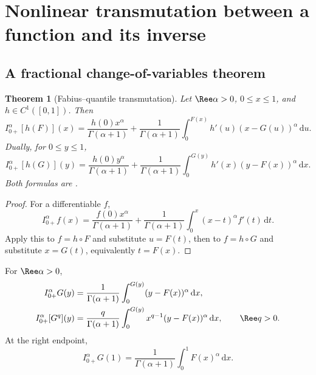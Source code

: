 \documentclass[11pt,oneside]{article}
\newtheorem{theorem}{Theorem}[section]
\theoremstyle{definition}
\theoremstyle{remark}
\newcommand{\dd}{\,\mathrm d}
\newcommand{\1}{\mathbf 1}
\begin{document}
\section{Nonlinear transmutation between a function and its inverse}
\label{p7:sec:inverse}

\subsection{A fractional change-of-variables theorem}

\begin{theorem}[Fabius--quantile transmutation]
\label{p7:thm:quantile-transmutation}
Let $\Ree\alpha>0$, $0\le x\le1$, and $h\in C^1([0,1])$.  Then
\begin{equation}
 I_{0+}^{\alpha}[h(F)](x)
 =\frac{h(0)x^\alpha}{\Gamma(\alpha+1)}
 +\frac1{\Gamma(\alpha+1)}
 \int_0^{F(x)}h'(u)(x-G(u))^\alpha\dd u.
 \label{p7:eq:F-to-G-transmutation}
\end{equation}
Dually, for $0\le y\le1$,
\begin{equation}
 I_{0+}^{\alpha}[h(G)](y)
 =\frac{h(0)y^\alpha}{\Gamma(\alpha+1)}
 +\frac1{\Gamma(\alpha+1)}
 \int_0^{G(y)}h'(x)(y-F(x))^\alpha\dd x.
 \label{p7:eq:G-to-F-transmutation}
\end{equation}
Both formulas are \statusproved.
\end{theorem}

\begin{proof}
For a differentiable $f$,
\[
 I_{0+}^{\alpha}f(x)
 =\frac{f(0)x^\alpha}{\Gamma(\alpha+1)}
 +\frac1{\Gamma(\alpha+1)}\int_0^x(x-t)^\alpha f'(t)\dd t.
\]
Apply this to $f=h\circ F$ and substitute $u=F(t)$, then to $f=h\circ G$ and substitute
$x=G(t)$, equivalently $t=F(x)$.
\end{proof}

\begin{corollary}
\label{p7:cor:inverse-fractional-integral}
For $\Ree\alpha>0$,
\begin{align}
 I_{0+}^{\alpha}G(y)
 &=\frac1{\Gamma(\alpha+1)}
   \int_0^{G(y)}(y-F(x))^\alpha\dd x,\label{p7:eq:inverse-RL}\\
 I_{0+}^{\alpha}[G^q](y)
 &=\frac q{\Gamma(\alpha+1)}
   \int_0^{G(y)}x^{q-1}(y-F(x))^\alpha\dd x,
 \qquad \Ree q>0.\label{p7:eq:inverse-power-RL}
\end{align}
At the right endpoint,
\begin{equation}
 I_{0+}^{\alpha}G(1)
 =\frac1{\Gamma(\alpha+1)}\int_0^1F(x)^\alpha\dd x.
 \label{p7:eq:inverse-RL-endpoint}
\end{equation}
\end{corollary}
\end{document}
